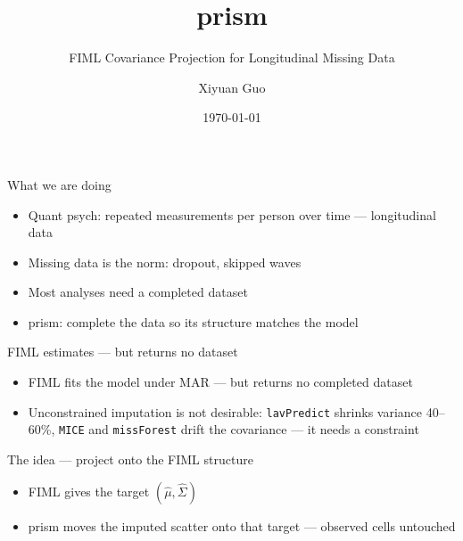 \documentclass[presentation, aspectratio=169]{beamer}
\author{Xiyuan Guo}
\date{\today}
\title{prism}
\subtitle{FIML Covariance Projection for Longitudinal Missing Data}
\begin{document}
\maketitle

\begin{frame}[label={sec:orgfd7a113}]{What we are doing}
\begin{itemize}
\item Quant psych: repeated measurements per person over time —
longitudinal data
\item Missing data is the norm: dropout, skipped waves
\item Most analyses need a completed dataset
\item prism: complete the data so its structure matches the model
\end{itemize}
\end{frame}

\begin{frame}[label={sec:orge6bf122},fragile]{FIML estimates — but returns no dataset}
 \begin{itemize}
\item FIML fits the model under MAR — but returns no completed dataset
\item \alert{Unconstrained imputation is not desirable:} \texttt{lavPredict} shrinks
variance 40–60\%, \texttt{MICE} and \texttt{missForest} drift the covariance — it
needs a constraint
\end{itemize}
\end{frame}

\begin{frame}[label={sec:org3570a17}]{The idea — project onto the FIML structure}
\begin{itemize}
\item FIML gives the target \((\hat{\mu}, \hat{\Sigma})\)
\item prism moves the imputed scatter onto that target — observed cells
untouched
\end{itemize}

\begin{center}
\end{center}
\end{frame}
\end{document}
